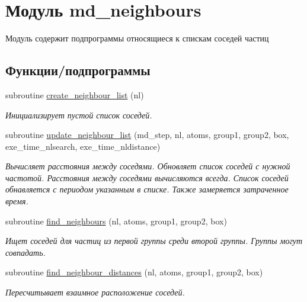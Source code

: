 \hypertarget{namespacemd__neighbours}{}\section{Модуль md\+\_\+neighbours}
\label{namespacemd__neighbours}


Модуль содержит подпрограммы относящиеся к спискам соседей частиц  


\subsection*{Функции/подпрограммы}
\begin{DoxyCompactItemize}
\item 
subroutine \mbox{\hyperlink{namespacemd__neighbours_a7246ea26ccbca29fb308ef82c2740bc9}{create\+\_\+neighbour\+\_\+list}} (nl)
\begin{DoxyCompactList}\small\item\em Инициализирует пустой список соседей. \end{DoxyCompactList}\item 
subroutine \mbox{\hyperlink{namespacemd__neighbours_aa3afc442e82c37b20e8963af79455747}{update\+\_\+neighbour\+\_\+list}} (md\+\_\+step, nl, atoms, group1, group2, box, exe\+\_\+time\+\_\+nlsearch, exe\+\_\+time\+\_\+nldistance)
\begin{DoxyCompactList}\small\item\em Вычисляет расстояния между соседями. Обновляет список соседей с нужной частотой.  Расстояния между соседями вычисляются всегда. Список соседей обнавляется с периодом указанным в списке. Также замеряется затраченное время. \end{DoxyCompactList}\item 
subroutine \mbox{\hyperlink{namespacemd__neighbours_a037f048abc67c7d83799c76aabaa8dac}{find\+\_\+neighbours}} (nl, atoms, group1, group2, box)
\begin{DoxyCompactList}\small\item\em Ищет соседей для частиц из первой группы среди второй группы.  Группы могут совпадать. \end{DoxyCompactList}\item 
subroutine \mbox{\hyperlink{namespacemd__neighbours_ad313293c81b7fa1b52e8376710c84c0f}{find\+\_\+neighbour\+\_\+distances}} (nl, atoms, group1, group2, box)
\begin{DoxyCompactList}\small\item\em Пересчитывает взаимное расположение соседей. \end{DoxyCompactList}\item 

\end{DoxyCompactItemize}
